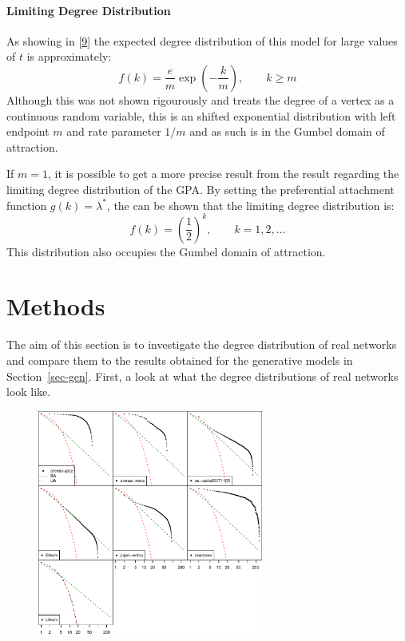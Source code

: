 \documentclass[
  10pt,
  a4paper,
]{scrreprt}
\theoremstyle{plain}
\theoremstyle{plain}
\theoremstyle{definition}
\theoremstyle{plain}
\theoremstyle{remark}
\begin{document}
{\hypertarget{limiting-degree-distribution-1}{%
\subsubsection{Limiting Degree
Distribution}\label{limiting-degree-distribution-1}}

As showing in {[}\protect\hyperlink{ref-Barabasi99}{9}{]} the expected
degree distribution of this model for large values of \(t\) is
approximately: \[
f(k) = \displaystyle\frac{e}{m}\exp\left(-\displaystyle\frac{k}{m}\right),\qquad k \ge m
\] Although this was not shown rigourously and treats the degree of a
vertex as a continuous random variable, this is an shifted exponential
distribution with left endpoint \(m\) and rate parameter \(1/m\) and as
such is in the Gumbel domain of attraction.

If \(m=1\), it is possible to get a more precise result from the result
regarding the limiting degree distribution of the GPA. By setting the
preferential attachment function \(g(k) = \lambda^*\), the can be shown
that the limiting degree distribution is: \[
f(k) = \left(\frac{1}{2} \right)^{k}, \qquad k=1,2,\ldots 
\] This distribution also occupies the Gumbel domain of attraction.

\hypertarget{sec-meth}{%
\chapter{Methods}\label{sec-meth}}

The aim of this section is to investigate the degree distribution of
real networks and compare them to the results obtained for the
generative models in Section~\ref{sec-gen}. First, a look at what the
degree distributions of real networks look like.

\begin{figure}[H]

{\centering \includegraphics[width=0.66\textwidth,height=\textheight]{doc_files/figure-pdf/fig-survs-1.pdf}

}
\end{figure}}
\end{document}
